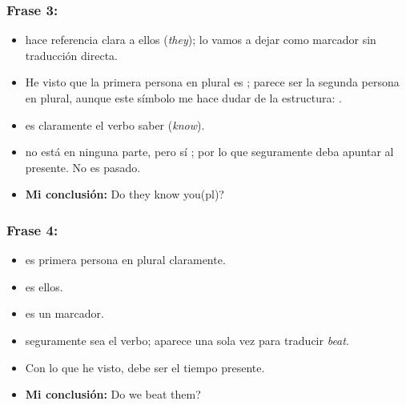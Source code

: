 \subsubsection*{Frase 3: \footnotesize{}}

\begin{itemize}
	\item {} hace referencia clara a ellos (\textit{they});  lo vamos a dejar como marcador sin traducción directa.
	
	\item He visto que la primera persona en plural es ;  parece ser la segunda persona en plural, aunque este símbolo me hace dudar de la estructura: .
	
	\item {} es claramente el verbo saber (\textit{know}).
	
	\item {} no está en ninguna parte, pero sí ; por lo que seguramente deba apuntar al presente. No es pasado.
	
	\item \textbf{Mi conclusión:} Do they know you(pl)?
\end{itemize}

\subsubsection*{Frase 4: \footnotesize{}}

\begin{itemize}
	\item {} es primera persona en plural claramente.
	
	\item {} es ellos.
	
	\item {} es un marcador.
	
	\item {} seguramente sea el verbo; aparece una sola vez para traducir \textit{beat}.
	
	\item Con lo que he visto,  debe ser el tiempo presente.
	
	\item \textbf{Mi conclusión:} Do we beat them?
\end{itemize}

